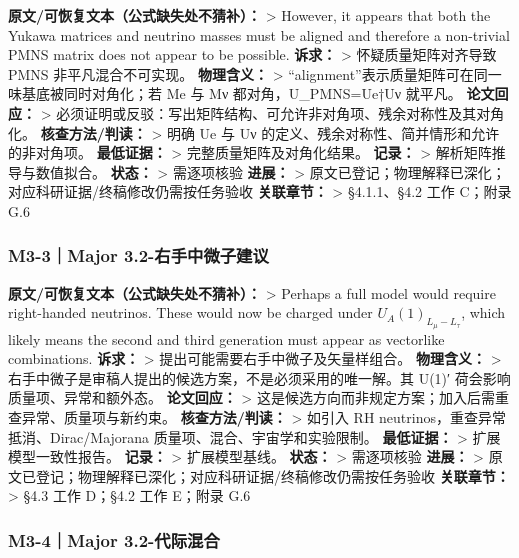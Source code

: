 \documentclass[
]{article}
\begin{document}
\textbf{原文/可恢复文本（公式缺失处不猜补）：} \textgreater{} However,
it appears that both the Yukawa matrices and neutrino masses must be
aligned and therefore a non-trivial PMNS matrix does not appear to be
possible. \textbf{诉求：} \textgreater{} 怀疑质量矩阵对齐导致 PMNS
非平凡混合不可实现。 \textbf{物理含义：} \textgreater{}
``alignment''表示质量矩阵可在同一味基底被同时对角化；若 Me 与 Mν
都对角，U\_PMNS=Ue†Uν 就平凡。 \textbf{论文回应：} \textgreater{}
必须证明或反驳：写出矩阵结构、可允许非对角项、残余对称性及其对角化。
\textbf{核查方法/判读：} \textgreater{} 明确 Ue 与 Uν
的定义、残余对称性、简并情形和允许的非对角项。 \textbf{最低证据：}
\textgreater{} 完整质量矩阵及对角化结果。 \textbf{记录：} \textgreater{}
解析矩阵推导与数值拟合。 \textbf{状态：} \textgreater{} 需逐项核验
\textbf{进展：} \textgreater{}
原文已登记；物理解释已深化；对应科研证据/终稿修改仍需按任务验收
\textbf{关联章节：} \textgreater{} §4.1.1、§4.2 工作 C；附录 G.6

\subsubsection{M3-3｜Major
3.2-右手中微子建议}\label{m3-3major-3.2-ux53f3ux624bux4e2dux5faeux5b50ux5efaux8bae}

\textbf{原文/可恢复文本（公式缺失处不猜补）：} \textgreater{} Perhaps a
full model would require right-handed neutrinos. These would now be
charged under \(U_A(1)_{L_{\mu}-L_{\tau}}\), which likely means the
second and third generation must appear as vectorlike combinations.
\textbf{诉求：} \textgreater{} 提出可能需要右手中微子及矢量样组合。
\textbf{物理含义：} \textgreater{}
右手中微子是审稿人提出的候选方案，不是必须采用的唯一解。其 U(1)′
荷会影响质量项、异常和额外态。 \textbf{论文回应：} \textgreater{}
这是候选方向而非规定方案；加入后需重查异常、质量项与新约束。
\textbf{核查方法/判读：} \textgreater{} 如引入 RH
neutrinos，重查异常抵消、Dirac/Majorana 质量项、混合、宇宙学和实验限制。
\textbf{最低证据：} \textgreater{} 扩展模型一致性报告。 \textbf{记录：}
\textgreater{} 扩展模型基线。 \textbf{状态：} \textgreater{} 需逐项核验
\textbf{进展：} \textgreater{}
原文已登记；物理解释已深化；对应科研证据/终稿修改仍需按任务验收
\textbf{关联章节：} \textgreater{} §4.3 工作 D；§4.2 工作 E；附录 G.6

\subsubsection{M3-4｜Major
3.2-代际混合}\label{m3-4major-3.2-ux4ee3ux9645ux6df7ux5408}
\end{document}
